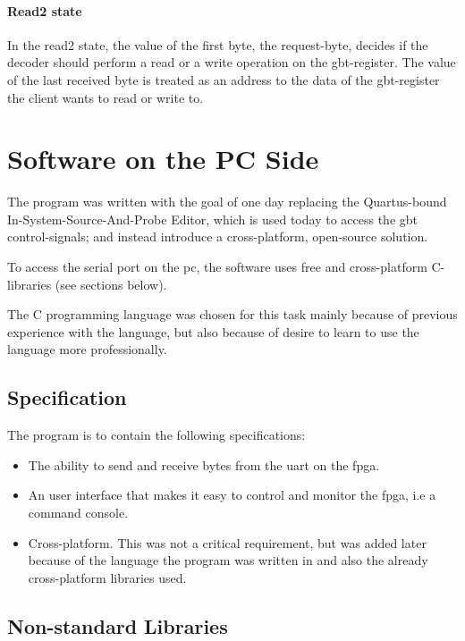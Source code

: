 \documentclass[main.tex]{subfiles}
\begin{document}
\subsubsection{Read2 state}
  In the read2 state, the value of the first byte, the request-byte, decides if the decoder should perform a read or a write operation on the gbt-register. The value of the last received byte is treated as an address to the data of the gbt-register the client wants to read or write to.  




\chapter{Software on the PC Side} \label{chap:software}

The program was written with the goal of one day replacing the Quartus-bound In-System-Source-And-Probe Editor, which is used today to access the \gls{gbt} control-signals; and instead introduce a cross-platform, open-source solution.

To access the serial port on the \acrshort{pc}, the software uses free and cross-platform C-libraries (see sections below).

The C programming language was chosen for this task mainly because of previous experience with the language, but also because of desire to learn to use the language more professionally. 

\section{Specification}

The program is to contain the following specifications:\\
\begin{itemize} \setlength{\itemsep}{10pt}
\item The ability to send and receive bytes from the \gls{uart} on the \gls{fpga}. 
\item An user interface that makes it easy to control and monitor the \gls{fpga}, i.e a command console.
\item Cross-platform. This was not a critical requirement, but was added later because of the language the program was written in and also the already cross-platform libraries used. 
\end{itemize}

\section{Non-standard Libraries}
\end{document}
